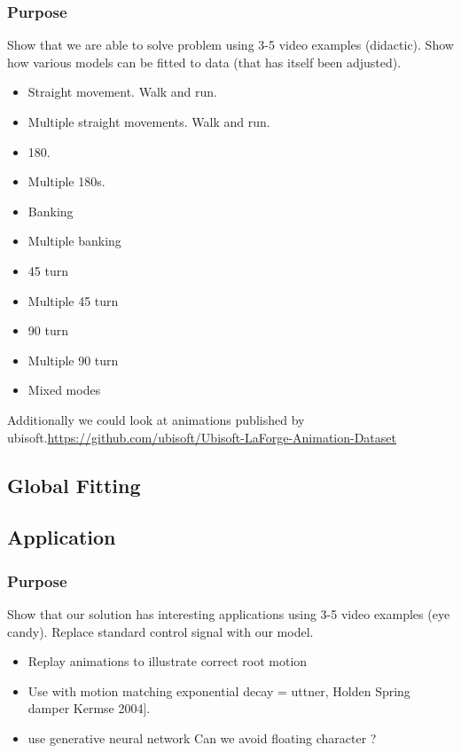 \subsubsection{Purpose} Show that we are able to solve problem using 3-5 video examples (didactic).
Show how various models can be fitted to data (that has itself been adjusted). 
\begin{itemize}
    \item Straight movement. Walk and run. 
    \item Multiple straight movements. Walk and run. 
    \item 180.
    \item Multiple 180s.
    \item Banking
    \item Multiple banking
    \item 45 turn
    \item Multiple 45 turn
    \item 90 turn
    \item Multiple 90 turn
    \item Mixed modes
\end{itemize}
Additionally we could look at animations published by ubisoft.\url{https://github.com/ubisoft/Ubisoft-LaForge-Animation-Dataset}


\subsection{Global Fitting}

\subsection{Application}
\subsubsection{Purpose} Show that our solution has interesting applications using 3-5 video examples (eye candy).
Replace standard control signal with our model.
\begin{itemize}
    \item{Replay animations to illustrate correct root motion}
    \item{Use with motion matching} exponential decay = uttner, Holden Spring damper Kermse 2004].
    \item{use generative neural network} Can we avoid floating character ?
\end{itemize}

